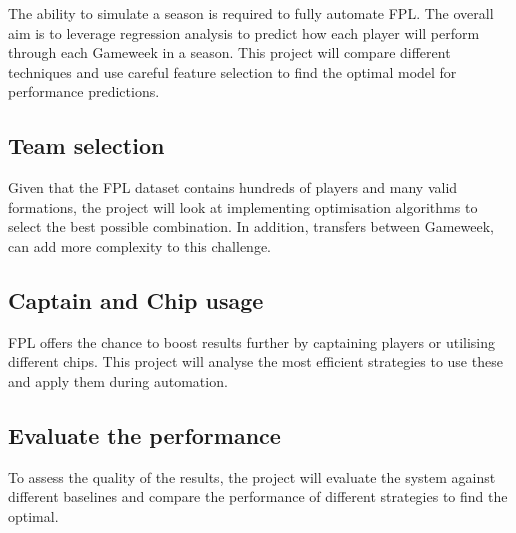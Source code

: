 The ability to simulate a season is required to fully automate FPL. The overall aim is to leverage regression analysis to predict how each player will perform through each Gameweek in a season. This project will compare different techniques and use careful feature selection to find the optimal model for performance predictions.

\subsection{Team selection}

Given that the FPL dataset contains hundreds of players and many valid formations, the project will look at implementing optimisation algorithms to select the best possible combination. In addition, transfers  between Gameweek, can add more complexity to this challenge.

\subsection{Captain and Chip usage}

FPL offers the chance to boost results further by captaining players or utilising different chips. This project will analyse the most efficient strategies to use these and apply them during automation.

\subsection{Evaluate the performance}

To assess the quality of the results, the project will evaluate the system against different baselines and compare the performance of different strategies to find the optimal.
